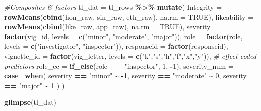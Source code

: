 \documentclass[
]{article}
\newenvironment{Shaded}{\begin{snugshade}}{\end{snugshade}}
\newcommand{\AttributeTok}[1]{\textcolor[rgb]{0.13,0.29,0.53}{#1}}
\newcommand{\CommentTok}[1]{\textcolor[rgb]{0.56,0.35,0.01}{\textit{#1}}}
\newcommand{\ConstantTok}[1]{\textcolor[rgb]{0.56,0.35,0.01}{#1}}
\newcommand{\DecValTok}[1]{\textcolor[rgb]{0.00,0.00,0.81}{#1}}
\newcommand{\FunctionTok}[1]{\textcolor[rgb]{0.13,0.29,0.53}{\textbf{#1}}}
\newcommand{\NormalTok}[1]{#1}
\newcommand{\OtherTok}[1]{\textcolor[rgb]{0.56,0.35,0.01}{#1}}
\newcommand{\SpecialCharTok}[1]{\textcolor[rgb]{0.81,0.36,0.00}{\textbf{#1}}}
\newcommand{\StringTok}[1]{\textcolor[rgb]{0.31,0.60,0.02}{#1}}
\begin{document}
\begin{Shaded}
\begin{Highlighting}[]
\CommentTok{\#Composites \& factors}
\NormalTok{tl\_dat }\OtherTok{=}\NormalTok{ tl\_rows }\SpecialCharTok{\%\textgreater{}\%}
  \FunctionTok{mutate}\NormalTok{(}
    \AttributeTok{Integrity      =} \FunctionTok{rowMeans}\NormalTok{(}\FunctionTok{cbind}\NormalTok{(hon\_raw, sin\_raw, eth\_raw), }\AttributeTok{na.rm =} \ConstantTok{TRUE}\NormalTok{),}
    \AttributeTok{likeability =} \FunctionTok{rowMeans}\NormalTok{(}\FunctionTok{cbind}\NormalTok{(like\_raw, app\_raw), }\AttributeTok{na.rm =} \ConstantTok{TRUE}\NormalTok{),}
    \AttributeTok{severity   =} \FunctionTok{factor}\NormalTok{(vig\_id,   }\AttributeTok{levels =} \FunctionTok{c}\NormalTok{(}\StringTok{"minor"}\NormalTok{, }\StringTok{"moderate"}\NormalTok{, }\StringTok{"major"}\NormalTok{)),}
    \AttributeTok{role       =} \FunctionTok{factor}\NormalTok{(role,     }\AttributeTok{levels =} \FunctionTok{c}\NormalTok{(}\StringTok{"investigator"}\NormalTok{, }\StringTok{"inspector"}\NormalTok{)),}
    \AttributeTok{responseid =} \FunctionTok{factor}\NormalTok{(responseid),}
    \AttributeTok{vignette\_id =} \FunctionTok{factor}\NormalTok{(vig\_letter, }\AttributeTok{levels =} \FunctionTok{c}\NormalTok{(}\StringTok{"k"}\NormalTok{,}\StringTok{"s"}\NormalTok{,}\StringTok{"h"}\NormalTok{,}\StringTok{"f"}\NormalTok{,}\StringTok{"x"}\NormalTok{,}\StringTok{"y"}\NormalTok{)),}
    \CommentTok{\# effect{-}coded predictors}
    \AttributeTok{role\_ec    =} \FunctionTok{if\_else}\NormalTok{(role }\SpecialCharTok{==} \StringTok{"inspector"}\NormalTok{, }\DecValTok{1}\NormalTok{, }\SpecialCharTok{{-}}\DecValTok{1}\NormalTok{),}
    \AttributeTok{severity\_num =} \FunctionTok{case\_when}\NormalTok{(}
\NormalTok{      severity }\SpecialCharTok{==} \StringTok{"minor"}    \SpecialCharTok{\textasciitilde{}} \SpecialCharTok{{-}}\DecValTok{1}\NormalTok{,}
\NormalTok{      severity }\SpecialCharTok{==} \StringTok{"moderate"} \SpecialCharTok{\textasciitilde{}}  \DecValTok{0}\NormalTok{,}
\NormalTok{      severity }\SpecialCharTok{==} \StringTok{"major"}    \SpecialCharTok{\textasciitilde{}}  \DecValTok{1}
\NormalTok{    )}
\NormalTok{  )}

\FunctionTok{glimpse}\NormalTok{(tl\_dat)}
\end{Highlighting}
\end{Shaded}
\end{document}
